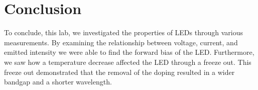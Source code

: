 \section{Conclusion}
To conclude, this lab, we investigated the properties of LEDs through various measurements. By examining the relationship between voltage, current, and emitted intensity we were able to find the forward bias of the LED. Furthermore, we saw how a temperature decrease affected the LED through a freeze out. This freeze out demonstrated that the removal of the doping resulted in a wider bandgap and a shorter wavelength. 


